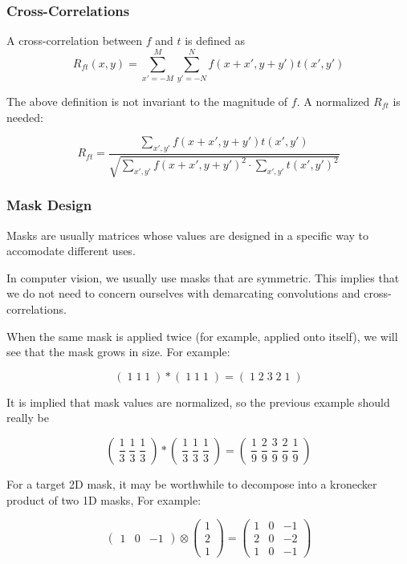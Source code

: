 \documentclass{article}
\begin{document}
\begin{multicols}{2}
\subsubsection{Cross-Correlations}

A cross-correlation between $f$ and $t$ is defined as 
$$
R_{ft}(x, y) = \sum_{x' = -M}^M \sum_{y' = -N}^N f(x+x', y+y') t(x',y')
$$

The above definition is not invariant to the magnitude of $f$. A normalized $R_{ft}$ is needed:

$$
R_{ft} = \frac{\sum_{x', y'}f(x+x', y+y') t(x',y')}{\sqrt{\sum_{x',y'}f(x+x', y+y')^2 \cdot \sum_{x',y'}t(x',y')^2}}
$$

\subsubsection{Mask Design}

Masks are usually matrices whose values are designed in a specific way to accomodate different uses. 

In computer vision, we usually use masks that are symmetric. This implies that we do not need to concern ourselves with demarcating convolutions and cross-correlations.

When the same mask is applied twice (for example, applied onto itself), we will see that the mask grows in size. For example:

$$
( \;1\; 1\; 1\; ) * ( \;1\; 1\; 1\; ) = ( \;1 \;2 \;3 \;2 \;1 \;)
$$

It is implied that mask values are normalized, so the previous example should really be

$$
\left( \;\frac{1}{3}\; \frac{1}{3}\; \frac{1}{3}\; \right) * \left( \;\frac{1}{3}\; \frac{1}{3}\; \frac{1}{3}\; \right) = \left( \;\frac{1}{9} \;\frac{2}{9} \;\frac{3}{9} \;\frac{2}{9} \;\frac{1}{9} \;\right)
$$

For a target 2D mask, it may be worthwhile to decompose into a kronecker product of two 1D masks, For example:

$$
\left(\begin{matrix} 1& 0 & -1 \end{matrix}\right) \otimes \left(\begin{matrix} 1\\ 2\\ 1 \end{matrix}\right) = \left(\begin{matrix} 1 & 0 & -1\\ 2 & 0 & -2\\ 1 & 0 & -1 \end{matrix}\right)
$$


\end{multicols}
\end{document}
